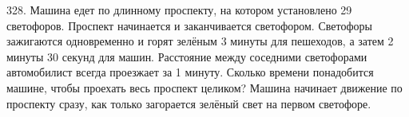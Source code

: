 328. Машина едет по длинному проспекту, на котором установлено 29 светофоров. Проспект начинается и заканчивается светофором. Светофоры зажигаются одновременно и горят зелёным 3 минуты для пешеходов, а затем 2 минуты 30 секунд для машин. Расстояние между соседними
светофорами автомобилист всегда проезжает за 1 минуту. Сколько времени понадобится машине, чтобы проехать весь проспект целиком? Машина начинает движение по проспекту сразу, как только загорается зелёный свет на первом светофоре.\\

